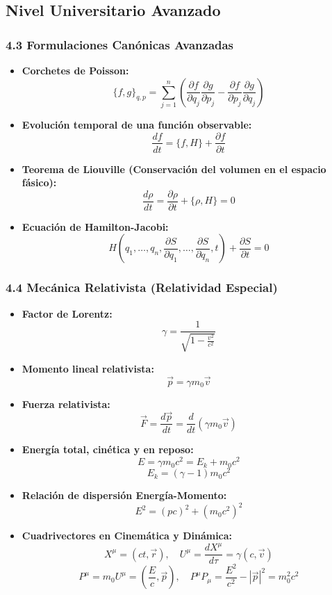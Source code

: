 \documentclass[11pt,a4paper]{article}
\begin{document}
\subsection*{Nivel Universitario Avanzado}

\subsubsection*{4.3 Formulaciones Canónicas Avanzadas}

\begin{itemize}
  \item \textbf{Corchetes de Poisson:}
  \[
    \{f, g\}_{q,p} = \sum_{j=1}^n \left( \frac{\partial f}{\partial q_j} \frac{\partial g}{\partial p_j} - \frac{\partial f}{\partial p_j} \frac{\partial g}{\partial q_j} \right)
  \]
  \item \textbf{Evolución temporal de una función observable:}
  \[
    \frac{df}{dt} = \{f, H\} + \frac{\partial f}{\partial t}
  \]
  \item \textbf{Teorema de Liouville (Conservación del volumen en el espacio fásico):}
  \[
    \frac{d\rho}{dt} = \frac{\partial \rho}{\partial t} + \{\rho, H\} = 0
  \]
  \item \textbf{Ecuación de Hamilton-Jacobi:}
  \[
    H\left( q_1, \dots, q_n, \frac{\partial S}{\partial q_1}, \dots, \frac{\partial S}{\partial q_n}, t \right) + \frac{\partial S}{\partial t} = 0
  \]
\end{itemize}

\subsubsection*{4.4 Mecánica Relativista (Relatividad Especial)}

\begin{itemize}
  \item \textbf{Factor de Lorentz:}
  \[
    \gamma = \frac{1}{\sqrt{1 - \frac{v^2}{c^2}}}
  \]
  \item \textbf{Momento lineal relativista:}
  \[
    \vec{p} = \gamma m_0 \vec{v}
  \]
  \item \textbf{Fuerza relativista:}
  \[
    \vec{F} = \frac{d\vec{p}}{dt} = \frac{d}{dt}(\gamma m_0 \vec{v})
  \]
  \item \textbf{Energía total, cinética y en reposo:}
  \[
    E = \gamma m_0 c^2 = E_k + m_0 c^2
  \]
  \[
    E_k = (\gamma - 1) m_0 c^2
  \]
  \item \textbf{Relación de dispersión Energía-Momento:}
  \[
    E^2 = (p c)^2 + (m_0 c^2)^2
  \]
  \item \textbf{Cuadrivectores en Cinemática y Dinámica:}
  \[
    X^\mu = (ct, \vec{r}), \quad U^\mu = \frac{dX^\mu}{d\tau} = \gamma(c, \vec{v})
  \]
  \[
    P^\mu = m_0 U^\mu = \left( \frac{E}{c}, \vec{p} \right), \quad P^\mu P_\mu = \frac{E^2}{c^2} - |\vec{p}|^2 = m_0^2 c^2
  \]
\end{itemize}
\end{document}
